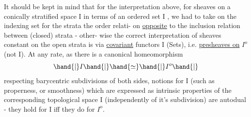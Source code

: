 It should be kept in mind that for the  interpretation above, for
sheaves on a conically stratified space \hand{$|$}I\hand{$|$} in terms of an ordered set
I , we had to take on the indexing set for the strata the order relati-%
on \uline{opposite} to the inclusion relation between (closed) strata - other-%
wise the correct interpretation of sheaves constant on the open strata
is via \uline{covariant} functors I \hand{$\longrightarrow$} (Sets), i.e. \uline{presheaves on} $I^o$ (not I).
At any rate, as there is a canonical homeomorphism
\[ \hand{|}I\hand{|} \hand{\simeq} \hand{|}I^o\hand{|} \]
respecting barycentric subdivisions of both sides, notions for I
(such as properness, or smoothness) which are expressed as intrinsic 
properties of the corresponding topological space \hand{$|$}I\hand{$|$} (independently of
it's subdivision) are autodual - they hold for I iff they do for $I^o$.

